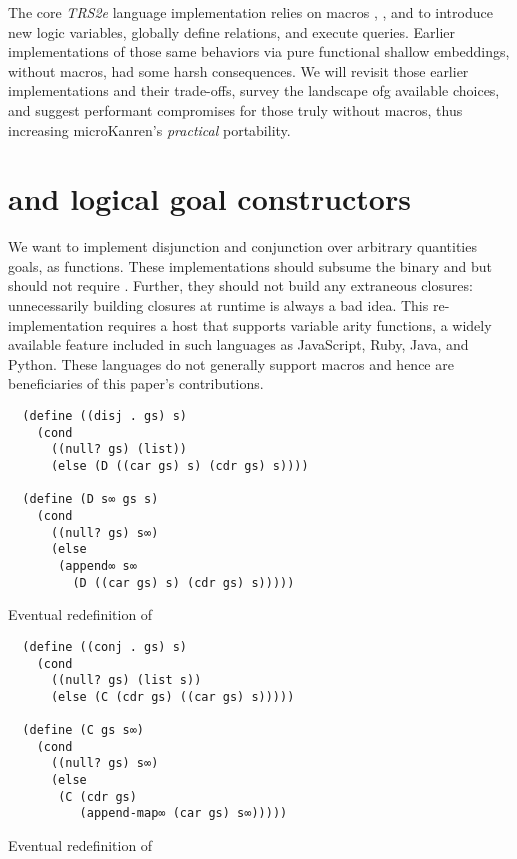 \documentclass[sigplan,draft,balance,pbalance,natbib=false]{acmart}
\begin{document}
The core \emph{TRS2e} language implementation relies on
macros , , and 
to introduce new logic variables, globally define relations, and
execute queries. Earlier implementations of those same behaviors via
pure functional shallow embeddings, without macros, had some harsh
consequences. We will revisit those earlier implementations and their
trade-offs, survey the landscape ofg available choices, and suggest
performant compromises for those truly without macros, thus increasing
microKanren's \emph{practical} portability.

\section{ and  logical goal
  constructors}\label{sec:conde}

We want to implement disjunction and conjunction over arbitrary
quantities goals, as functions. These implementations should subsume
the binary  and  but should not
require . Further, they should not build any
extraneous closures: unnecessarily building closures at runtime is
always a bad idea. This re-implementation requires a host that
supports variable arity functions, a widely available feature included
in such languages as JavaScript, Ruby, Java, and Python. These
languages do not generally support macros and hence are beneficiaries
of this paper's contributions.

\begin{listing}
  \begin{verbatim}
  (define ((disj . gs) s)
    (cond
      ((null? gs) (list))
      (else (D ((car gs) s) (cdr gs) s))))

  (define (D s∞ gs s)
    (cond
      ((null? gs) s∞)
      (else
       (append∞ s∞
         (D ((car gs) s) (cdr gs) s)))))
  \end{verbatim}
  \caption{Eventual redefinition of }
  \label{mnt:disj-reimplementation}
\end{listing}

\begin{listing}
  \begin{verbatim}
  (define ((conj . gs) s)
    (cond
      ((null? gs) (list s))
      (else (C (cdr gs) ((car gs) s)))))

  (define (C gs s∞)
    (cond
      ((null? gs) s∞)
      (else
       (C (cdr gs)
          (append-map∞ (car gs) s∞)))))
  \end{verbatim}
  \caption{Eventual redefinition of }
  \label{mnt:conj-reimplementation}
\end{listing}
\end{document}
